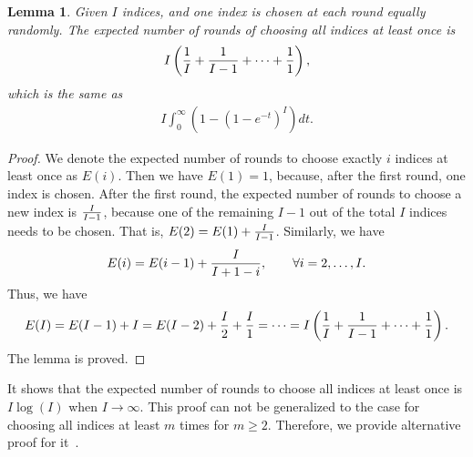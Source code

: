 \documentclass{article}
\newtheorem{lemma}{Lemma}
\begin{document}
\begin{lemma}\label{lemma1} Given $I$ indices, and one index is chosen at each round equally randomly. The expected number of rounds of choosing all indices at least once is 
\begin{align*}
    I\left({1\over I}+{1\over I-1}+\dots+{1\over 1}\right),
\end{align*}
which is the same as 
\begin{align*}
    I\int_0^\infty \left(1- (1-e^{-t})^I\right)dt.
\end{align*}
\end{lemma}
\begin{proof}
We denote the expected number of rounds to choose exactly $i$ indices at least once as $E(i)$. Then we have $E(1)=1$, because, after the first round, one index is chosen. After the first round, the expected number of rounds to choose a new index is ${I\over I-1}$, because one of the remaining $I-1$ out of the total $I$ indices needs to be chosen. That is, $E(2)=E(1)+{I\over I-1}$. Similarly, we have 
\begin{align*}E(i)=E(i-1)+{I\over I+1-i},\qquad \forall i=2,\dots,I.\end{align*}  Thus, we have 
\begin{align*}
    E(I)= E(I-1)+I=E(I-2)+{I\over2}+{I\over1}=\dots=I\left({1\over I}+{1\over I-1}+\dots+{1\over 1}\right).
\end{align*}
The lemma is proved.
\end{proof}
It shows that the expected number of rounds to choose all indices at least once is $I\log (I)$ when $I\rightarrow\infty$. This proof can not be generalized to the case for choosing all indices at least $m$ times for $m\geq 2$. Therefore, we provide alternative proof for it~\citep[Example 5.17]{Ross14}.
\end{document}
